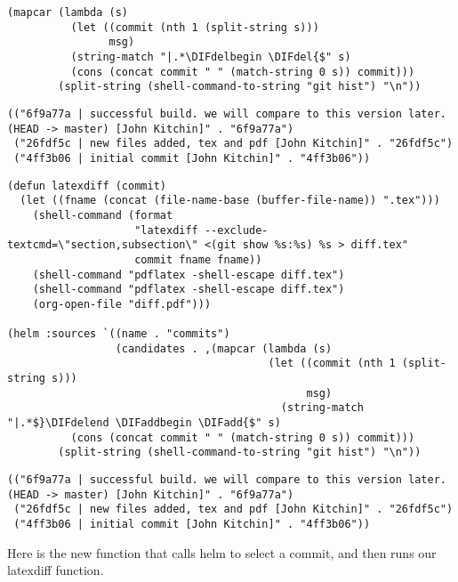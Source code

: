 \documentclass[11pt]{article}
\providecommand{\DIFadd}[1]{{\protect\color{blue}\uwave{#1}}} %
\providecommand{\DIFdel}[1]{{\protect\color{red}\sout{#1}}}                      %
\providecommand{\DIFaddbegin}{} %
\providecommand{\DIFdelbegin}{} %
\providecommand{\DIFdelend}{} %
\begin{document}
\begin{verbatim}
(mapcar (lambda (s)
          (let ((commit (nth 1 (split-string s)))
                msg)
          (string-match "|.*\DIFdelbegin \DIFdel{$" s)
          (cons (concat commit " " (match-string 0 s)) commit)))
        (split-string (shell-command-to-string "git hist") "\n"))
\end{verbatim}

\begin{verbatim}
(("6f9a77a | successful build. we will compare to this version later. (HEAD -> master) [John Kitchin]" . "6f9a77a")
 ("26fdf5c | new files added, tex and pdf [John Kitchin]" . "26fdf5c")
 ("4ff3b06 | initial commit [John Kitchin]" . "4ff3b06"))
\end{verbatim}


\begin{verbatim}
(defun latexdiff (commit)
  (let ((fname (concat (file-name-base (buffer-file-name)) ".tex")))
    (shell-command (format
                    "latexdiff --exclude-textcmd=\"section,subsection\" <(git show %s:%s) %s > diff.tex"
                    commit fname fname))
    (shell-command "pdflatex -shell-escape diff.tex")
    (shell-command "pdflatex -shell-escape diff.tex")
    (org-open-file "diff.pdf")))

(helm :sources `((name . "commits")
                 (candidates . ,(mapcar (lambda (s)
                                         (let ((commit (nth 1 (split-string s)))
                                               msg)
                                           (string-match "|.*$}\DIFdelend \DIFaddbegin \DIFadd{$" s)
          (cons (concat commit " " (match-string 0 s)) commit)))
        (split-string (shell-command-to-string "git hist") "\n"))
\end{verbatim}

\begin{verbatim}
(("6f9a77a | successful build. we will compare to this version later. (HEAD -> master) [John Kitchin]" . "6f9a77a")
 ("26fdf5c | new files added, tex and pdf [John Kitchin]" . "26fdf5c")
 ("4ff3b06 | initial commit [John Kitchin]" . "4ff3b06"))
\end{verbatim}

Here is the new function that calls helm to select a commit, and then runs our latexdiff function.
\end{document}
